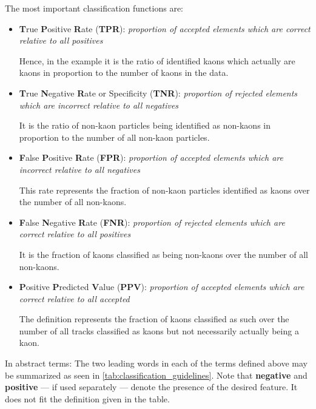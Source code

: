 The most important classification functions are:
\begin{itemize}
	\item \textbf{T}rue \textbf{P}ositive \textbf{R}ate (\textbf{TPR}): \textit{proportion of accepted elements which are correct relative to all positives}

	\nobreak
	Hence, in the example it is the ratio of identified kaons which actually are kaons in proportion to the number of kaons in the data.

	\item \textbf{T}rue \textbf{N}egative \textbf{R}ate or Specificity (\textbf{TNR}): \textit{proportion of rejected elements which are incorrect relative to all negatives}

	\nobreak
	It is the ratio of non-kaon particles being identified as non-kaons in proportion to the number of all non-kaon particles.

	\item \textbf{F}alse \textbf{P}ositive \textbf{R}ate (\textbf{FPR}): \textit{proportion of accepted elements which are incorrect relative to all negatives}

	\nobreak
	This rate represents the fraction of non-kaon particles identified as kaons over the number of all non-kaons.

	\item \textbf{F}alse \textbf{N}egative \textbf{R}ate (\textbf{FNR}): \textit{proportion of rejected elements which are correct relative to all positives}

	\nobreak
	It is the fraction of kaons classified as being non-kaons over the number of all non-kaons.

	\item \textbf{P}ositive \textbf{P}redicted \textbf{V}alue (\textbf{PPV}): \textit{proportion of accepted elements which are correct relative to all accepted}

	\nobreak
	The definition represents the fraction of kaons classified as such over the number of all tracks classified as kaons but not necessarily actually being a kaon.

\end{itemize}

In abstract terms: The two leading words in each of the terms defined above may be summarized as seen in \autoref{tab:classification_guidelines}. Note that \textbf{negative} and \textbf{positive} --- if used separately --- denote the presence of the desired feature. It does not fit the definition given in the table.


